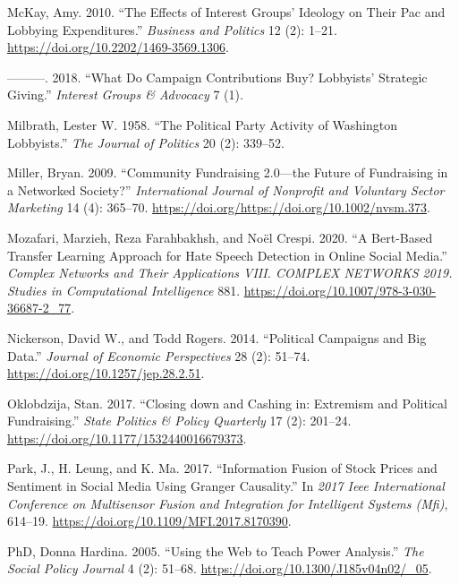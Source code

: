 \documentclass[12pt,]{article}
\begin{document}
\leavevmode\hypertarget{ref-mckay2010}{}%
McKay, Amy. 2010. ``The Effects of Interest Groups' Ideology on Their
Pac and Lobbying Expenditures.'' \emph{Business and Politics} 12 (2):
1--21. \url{https://doi.org/10.2202/1469-3569.1306}.

\leavevmode\hypertarget{ref-mckay2018}{}%
---------. 2018. ``What Do Campaign Contributions Buy? Lobbyists'
Strategic Giving.'' \emph{Interest Groups \& Advocacy} 7 (1).

\leavevmode\hypertarget{ref-milbrath1958}{}%
Milbrath, Lester W. 1958. ``The Political Party Activity of Washington
Lobbyists.'' \emph{The Journal of Politics} 20 (2): 339--52.

\leavevmode\hypertarget{ref-miller2009}{}%
Miller, Bryan. 2009. ``Community Fundraising 2.0---the Future of
Fundraising in a Networked Society?'' \emph{International Journal of
Nonprofit and Voluntary Sector Marketing} 14 (4): 365--70.
\url{https://doi.org/https://doi.org/10.1002/nvsm.373}.

\leavevmode\hypertarget{ref-mozafari2020}{}%
Mozafari, Marzieh, Reza Farahbakhsh, and Noël Crespi. 2020. ``A
Bert-Based Transfer Learning Approach for Hate Speech Detection in
Online Social Media.'' \emph{Complex Networks and Their Applications
VIII. COMPLEX NETWORKS 2019. Studies in Computational Intelligence} 881.
\url{https://doi.org/10.1007/978-3-030-36687-2_77}.

\leavevmode\hypertarget{ref-nickerson2014}{}%
Nickerson, David W., and Todd Rogers. 2014. ``Political Campaigns and
Big Data.'' \emph{Journal of Economic Perspectives} 28 (2): 51--74.
\url{https://doi.org/10.1257/jep.28.2.51}.

\leavevmode\hypertarget{ref-oklobdzija2017}{}%
Oklobdzija, Stan. 2017. ``Closing down and Cashing in: Extremism and
Political Fundraising.'' \emph{State Politics \& Policy Quarterly} 17
(2): 201--24. \url{https://doi.org/10.1177/1532440016679373}.

\leavevmode\hypertarget{ref-park2017}{}%
Park, J., H. Leung, and K. Ma. 2017. ``Information Fusion of Stock
Prices and Sentiment in Social Media Using Granger Causality.'' In
\emph{2017 Ieee International Conference on Multisensor Fusion and
Integration for Intelligent Systems (Mfi)}, 614--19.
\url{https://doi.org/10.1109/MFI.2017.8170390}.

\leavevmode\hypertarget{ref-hardina2005}{}%
PhD, Donna Hardina. 2005. ``Using the Web to Teach Power Analysis.''
\emph{The Social Policy Journal} 4 (2): 51--68.
\url{https://doi.org/10.1300/J185v04n02/_05}.
\end{document}
